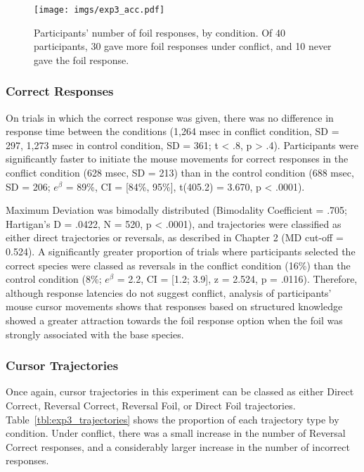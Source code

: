 \begin{figure}[ht]
  \centering
  \texttt{[image: imgs/exp3\_acc.pdf]}
  \caption[Participants' number of foil responses, by condition, Experiment 3.]{
    \label{fig:exp3_acc}
    Participants' number of foil responses, by condition.
    Of 40 participants, 30 gave more foil responses under conflict,
    and 10 never gave the foil response.
}
\end{figure}



\subsubsection{Correct Responses}

On trials in which the correct response was given,
there was no difference in response time between the conditions
(1,264 msec in conflict condition, SD = 297,
1,273 msec in control condition, SD = 361; t < .8, p > .4).
Participants were significantly faster to initiate the mouse movements
for correct responses in the conflict condition (628  msec, SD = 213)
than in the control condition (688 msec, SD = 206;
$e^{\beta}$ = 89\%, CI = [84\%, 95\%], t(405.2) = 3.670, p < .0001).

Maximum Deviation was bimodally distributed
(Bimodality Coefficient = .705; Hartigan's D = .0422, N = 520, p < .0001),
and trajectories were classified as either
direct trajectories or reversals, as described in Chapter 2 (MD cut-off = 0.524).
A significantly greater proportion of
trials where participants selected the correct species
were classed as reversals
in the conflict condition (16\%)
than the control condition (8\%;
$e^{\beta}$ = 2.2, CI = [1.2; 3.9], z = 2.524, p = .0116).
Therefore, although response latencies do not suggest conflict,
analysis of participants' mouse cursor movements shows that
responses based on structured knowledge
showed a greater attraction towards the foil response option
when the foil was strongly associated with the base species.

\subsubsection{Cursor Trajectories}

Once again, cursor trajectories in this experiment
can be classed as either
Direct Correct, Reversal Correct, Reversal Foil, or Direct Foil trajectories.
Table~\ref{tbl:exp3_trajectories} shows the proportion of
each trajectory type by condition.
Under conflict, there was a small increase in the number of
Reversal Correct responses,
and a considerably larger increase in the number of incorrect responses.

